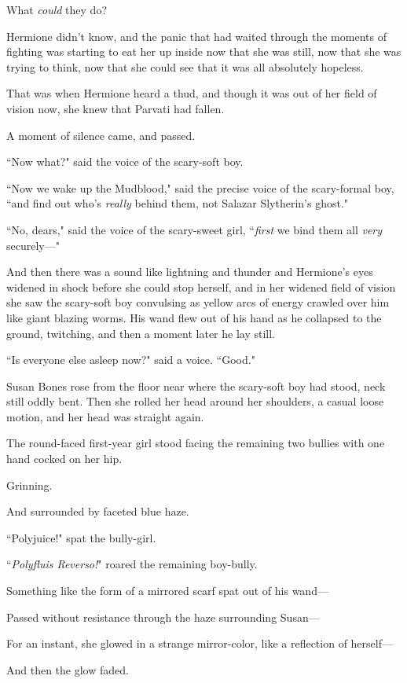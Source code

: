 What \emph{could} they do?

Hermione didn't know, and the panic that had waited through the moments of fighting was starting to eat her up inside now that she was still, now that she was trying to think, now that she could see that it was all absolutely hopeless.

That was when Hermione heard a thud, and though it was out of her field of vision now, she knew that Parvati had fallen.

A moment of silence came, and passed.

``Now what?" said the voice of the scary-soft boy.

``Now we wake up the Mudblood," said the precise voice of the scary-formal boy, ``and find out who's \emph{really} behind them, not Salazar Slytherin's ghost."

``No, dears," said the voice of the scary-sweet girl, ``\emph{first} we bind them all \emph{very} securely—"

And then there was a sound like lightning and thunder and Hermione's eyes widened in shock before she could stop herself, and in her widened field of vision she saw the scary-soft boy convulsing as yellow arcs of energy crawled over him like giant blazing worms. His wand flew out of his hand as he collapsed to the ground, twitching, and then a moment later he lay still.

``Is everyone else asleep now?" said a voice. ``Good."

Susan Bones rose from the floor near where the scary-soft boy had stood, neck still oddly bent. Then she rolled her head around her shoulders, a casual loose motion, and her head was straight again.

The round-faced first-year girl stood facing the remaining two bullies with one hand cocked on her hip.

Grinning.

And surrounded by faceted blue haze.

``Polyjuice!" spat the bully-girl.

``\emph{Polyfluis Reverso!}" roared the remaining boy-bully.

Something like the form of a mirrored scarf spat out of his wand—

Passed without resistance through the haze surrounding Susan—

For an instant, she glowed in a strange mirror-color, like a reflection of herself—

And then the glow faded.

